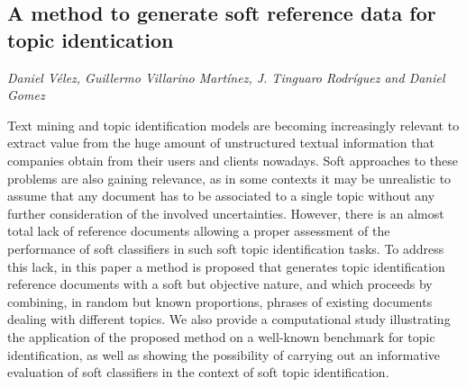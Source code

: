 \documentclass[../booklet.tex]{subfiles}
\begin{document}
\subsection[A method to generate soft reference data for topic identication. {\it Daniel Vélez, Guillermo Villarino Martínez, J. Tinguaro Rodríguez and Daniel Gomez}]{A method to generate soft reference data for topic identication}
   

\begin{center}
  {\it Daniel Vélez, Guillermo Villarino Martínez, J. Tinguaro Rodríguez and Daniel Gomez}
\end{center}



Text mining and topic identification models are becoming increasingly relevant to extract value from the huge amount of unstructured textual information that companies obtain from their users and clients nowadays. Soft approaches to these problems are also gaining relevance, as in some contexts it may be unrealistic to assume that any document has to be associated to a single topic without any further consideration of the involved uncertainties. However, there is an almost total lack of reference documents allowing a proper assessment of the performance of soft classifiers in such soft topic identification tasks. To address this lack, in this paper a method is proposed that generates topic identification reference documents with a soft but objective nature, and which proceeds by combining, in random but known proportions, phrases of existing documents dealing with different topics. We also provide a computational study illustrating the application of the proposed method on a well-known benchmark for topic identification, as well as showing the possibility of carrying out an informative evaluation of soft classifiers in the context of soft topic identification.

\end{document}
